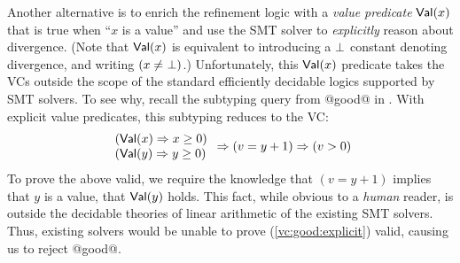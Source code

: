 
%
Another alternative is to enrich the refinement logic
with a \emph{value predicate} $\mathsf{Val}(x)$ that is true when 
``$x$ is a value'' and use the SMT solver to 
\emph{explicitly} reason about divergence.
%
(Note that $\mathsf{Val}(x)$ is equivalent to introducing a 
$\perp$ constant denoting divergence, and 
writing $(x \not =\ \perp)$.)
%
Unfortunately, this $\mathsf{Val}(x)$ predicate takes the VCs 
outside the scope of the standard efficiently decidable logics 
supported by SMT solvers.
%
To see why, recall 
the subtyping query %
from @good@ in . 
With explicit value predicates, 
this subtyping reduces to the VC:
%
\begin{align}
\begin{array}{l}
{(\mathsf{Val}(x) \Rightarrow x \geq 0)}\\ 
{(\mathsf{Val}(y) \Rightarrow y \geq 0)} 
\end{array} 
\Rightarrow
{(v = y+1)}   \Rightarrow {(v > 0)}\label{vc:good:explicit}
\end{align}
%
To prove the above valid, we require the knowledge 
that $(v = y+1)$ implies that $y$ is a value, \ie that 
$\mathsf{Val}(y)$ holds.
%
This fact, while obvious to a \emph{human} reader, is 
outside the decidable theories of linear arithmetic
of the existing SMT solvers.
%
Thus, existing solvers would be unable to prove (\ref{vc:good:explicit}) 
valid, causing us to reject @good@.

